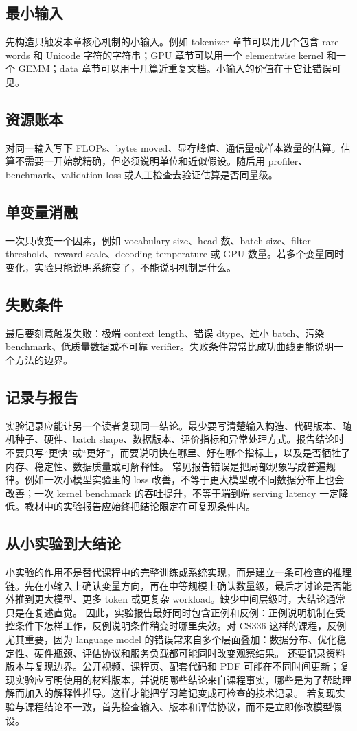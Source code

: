 \documentclass[a4paper]{article}
\begin{document}
\subsection{最小输入}
先构造只触发本章核心机制的小输入。例如 tokenizer 章节可以用几个包含 rare words 和 Unicode 字符的字符串；GPU 章节可以用一个 elementwise kernel 和一个 GEMM；data 章节可以用十几篇近重复文档。小输入的价值在于它让错误可见。
\subsection{资源账本}
对同一输入写下 FLOPs、bytes moved、显存峰值、通信量或样本数量的估算。估算不需要一开始就精确，但必须说明单位和近似假设。随后用 profiler、benchmark、validation loss 或人工检查去验证估算是否同量级。
\subsection{单变量消融}
一次只改变一个因素，例如 vocabulary size、head 数、batch size、filter threshold、reward scale、decoding temperature 或 GPU 数量。若多个变量同时变化，实验只能说明系统变了，不能说明机制是什么。
\subsection{失败条件}
最后要刻意触发失败：极端 context length、错误 dtype、过小 batch、污染 benchmark、低质量数据或不可靠 verifier。失败条件常常比成功曲线更能说明一个方法的边界。
\subsection{记录与报告}
实验记录应能让另一个读者复现同一结论。最少要写清楚输入构造、代码版本、随机种子、硬件、batch shape、数据版本、评价指标和异常处理方式。报告结论时不要只写“更快”或“更好”，而要说明快在哪里、好在哪个指标上，以及是否牺牲了内存、稳定性、数据质量或可解释性。
常见报告错误是把局部现象写成普遍规律。例如一次小模型实验里的 loss 改善，不等于更大模型或不同数据分布上也会改善；一次 kernel benchmark 的吞吐提升，不等于端到端 serving latency 一定降低。教材中的实验报告应始终把结论限定在可复现条件内。
\subsection{从小实验到大结论}
小实验的作用不是替代课程中的完整训练或系统实现，而是建立一条可检查的推理链。先在小输入上确认变量方向，再在中等规模上确认数量级，最后才讨论是否能外推到更大模型、更多 token 或更复杂 workload。缺少中间层级时，大结论通常只是在复述直觉。
因此，实验报告最好同时包含正例和反例：正例说明机制在受控条件下怎样工作，反例说明条件稍变时哪里失效。对 CS336 这样的课程，反例尤其重要，因为 language model 的错误常来自多个层面叠加：数据分布、优化稳定性、硬件瓶颈、评估协议和服务负载都可能同时改变观察结果。
还要记录资料版本与复现边界。公开视频、课程页、配套代码和 PDF 可能在不同时间更新；复现实验应写明使用的材料版本，并说明哪些结论来自课程事实，哪些是为了帮助理解而加入的解释性推导。这样才能把学习笔记变成可检查的技术记录。
若复现实验与课程结论不一致，首先检查输入、版本和评估协议，而不是立即修改模型假设。
\end{document}

